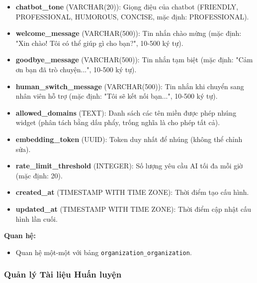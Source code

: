 \begin{itemize}
    \item \textbf{chatbot\_tone} (VARCHAR(20)): Giọng điệu của chatbot (FRIENDLY, PROFESSIONAL, HUMOROUS, CONCISE, mặc định: PROFESSIONAL).
    \item \textbf{welcome\_message} (VARCHAR(500)): Tin nhắn chào mừng (mặc định: "Xin chào! Tôi có thể giúp gì cho bạn?", 10-500 ký tự).
    \item \textbf{goodbye\_message} (VARCHAR(500)): Tin nhắn tạm biệt (mặc định: "Cảm ơn bạn đã trò chuyện...", 10-500 ký tự).
    \item \textbf{human\_switch\_message} (VARCHAR(500)): Tin nhắn khi chuyển sang nhân viên hỗ trợ (mặc định: "Tôi sẽ kết nối bạn...", 10-500 ký tự).
    \item \textbf{allowed\_domains} (TEXT): Danh sách các tên miền được phép nhúng widget (phân tách bằng dấu phẩy, trống nghĩa là cho phép tất cả).
    \item \textbf{embedding\_token} (UUID): Token duy nhất để nhúng (không thể chỉnh sửa).
    \item \textbf{rate\_limit\_threshold} (INTEGER): Số lượng yêu cầu AI tối đa mỗi giờ (mặc định: 20).
    \item \textbf{created\_at} (TIMESTAMP WITH TIME ZONE): Thời điểm tạo cấu hình.
    \item \textbf{updated\_at} (TIMESTAMP WITH TIME ZONE): Thời điểm cập nhật cấu hình lần cuối.
\end{itemize}
\textbf{Quan hệ:}
\begin{itemize}
    \item Quan hệ một-một với bảng \texttt{organization\_organization}.
\end{itemize}

\subsubsection{Quản lý Tài liệu Huấn luyện}

